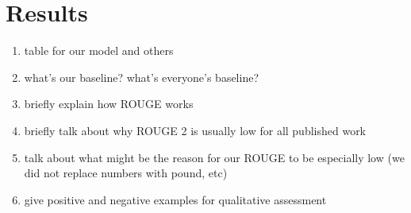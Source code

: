 \section{Results}
\label{sec: result}

\begin{enumerate}
\item table for our model and others
\item what's our baseline? what's everyone's baseline?
\item briefly explain how ROUGE works
\item briefly talk about why ROUGE 2 is usually low for all published work
\item talk about what might be the reason for our ROUGE to be especially low (we did not replace numbers with pound, etc)
\item give positive and negative examples for qualitative assessment
\end{enumerate}